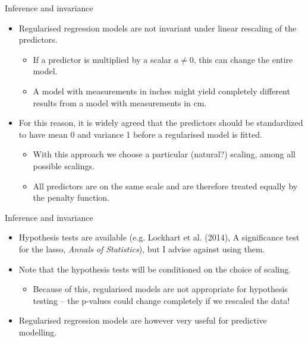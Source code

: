 \documentclass[10pt]{beamer}
\begin{document}
\begin{frame}{Inference and invariance}
\begin{itemize}
\item Regularised regression models are not invariant under linear rescaling of the predictors.\pause
\begin{itemize}
\item If a predictor is multiplied by a scalar $a\neq 0$, this can change the entire model.\pause
\item A model with measurements in inches might yield completely different results from a model with measurements in cm.\\[3mm]\pause
\end{itemize}
\item For this reason, it is widely agreed that the predictors should be standardized to have mean 0 and variance 1 before a regularised model is fitted.\pause
\begin{itemize}
\item With this approach we choose a particular (natural?) scaling, among all possible scalings.\pause
\item All predictors are on the same scale and are therefore treated equally by the penalty function.\pause
\end{itemize}
\end{itemize}
\end{frame}

\begin{frame}{Inference and invariance}
\begin{itemize}
\item Hypothesis tests are available (e.g. Lockhart et al. (2014), A significance test for the lasso, \emph{Annals of Statistics}), but I advise against using them.\\[3mm]\pause
\item Note that the hypothesis tests will be conditioned on the choice of scaling.\pause
\begin{itemize}
\item Because of this, regularised models are not appropriate for hypothesis testing -- the p-values could change completely if we rescaled the data!\\[3mm]\pause
\end{itemize}
\item Regularised regression models are however very useful for {\color{uured}predictive modelling}.
\end{itemize}
\end{frame}
\end{document}
